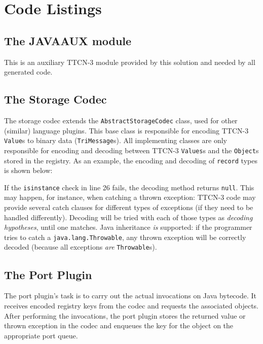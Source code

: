 \chapter{Code Listings}


\section{The JAVAAUX module}
\label{sec:javaaux-appendix}

This is an auxiliary \ac{TTCN-3} module provided by this solution
and needed by all generated code.

{
\scriptsize
{}
}


\section{The Storage Codec}

The storage codec extends the \verb=AbstractStorageCodec= class,
used for other (similar) language plugins.
This base class is responsible for encoding \ac{TTCN-3} \verb=Value=s
to binary data (\verb=TriMessage=s).
All implementing classes are only responsible for encoding and decoding
between \ac{TTCN-3} \verb=Values=s and the \verb=Object=s
stored in the registry.
As an example, the encoding and decoding of \verb=record= types is shown below:

{
\scriptsize
\renewcommand\verbatimtabsize{4\relax}
}

If the \verb=isinstance= check in line 26 fails,
the decoding method returns \verb=null=.
This may happen, for instance, when catching a thrown exception:
\ac{TTCN-3} code may provide several catch clauses
for different types of exceptions (if they need to be handled differently).
Decoding will be tried with each of those types as \emph{decoding hypotheses},
until one matches.
Java inheritance \emph{is} supported:
if the programmer tries to catch a \verb=java.lang.Throwable=,
any thrown exception will be correctly decoded
(because all exceptions \emph{are} \verb=Throwable=s).


\section{The Port Plugin}

The port plugin's task is to carry out the actual invocations on Java bytecode.
It receives encoded registry keys from the codec
and requests the associated objects.
After performing the invocations, the port plugin stores the returned value
or thrown exception in the codec
and enqueues the key for the object on the appropriate port queue.

